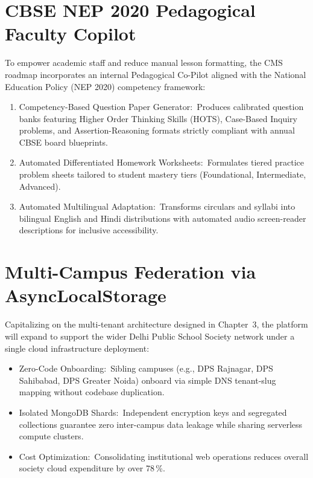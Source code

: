 \documentclass[12pt, a4paper, oneside]{report}
\def\textbf#1{#1}
\begin{document}
\section{CBSE NEP 2020 Pedagogical Faculty Copilot}

To empower academic staff and reduce manual lesson formatting, the CMS roadmap
incorporates an internal \textbf{Pedagogical Co-Pilot} aligned with the
National Education Policy (NEP 2020) competency framework:
\begin{enumerate}
  \item \textbf{Competency-Based Question Paper Generator:}\ Produces calibrated
        question banks featuring Higher Order Thinking Skills (HOTS), Case-Based
        Inquiry problems, and Assertion-Reasoning formats strictly compliant with
        annual CBSE board blueprints.
  \item \textbf{Automated Differentiated Homework Worksheets:}\ Formulates tiered
        practice problem sheets tailored to student mastery tiers (Foundational,
        Intermediate, Advanced).
  \item \textbf{Automated Multilingual Adaptation:}\ Transforms circulars and
        syllabi into bilingual English and Hindi distributions with automated
        audio screen-reader descriptions for inclusive accessibility.
\end{enumerate}

\section{Multi-Campus Federation via AsyncLocalStorage}

Capitalizing on the multi-tenant architecture designed in Chapter~3, the
platform will expand to support the wider \textbf{Delhi Public School Society}
network under a single cloud infrastructure deployment:
\begin{itemize}
  \item \textbf{Zero-Code Onboarding:}\ Sibling campuses (e.g., DPS Rajnagar,
        DPS Sahibabad, DPS Greater Noida) onboard via simple DNS tenant-slug
        mapping without codebase duplication.
  \item \textbf{Isolated MongoDB Shards:}\ Independent encryption keys and
        segregated collections guarantee zero inter-campus data leakage while
        sharing serverless compute clusters.
  \item \textbf{Cost Optimization:}\ Consolidating institutional web operations
        reduces overall society cloud expenditure by over \textbf{78\,\%}.
\end{itemize}
\end{document}
